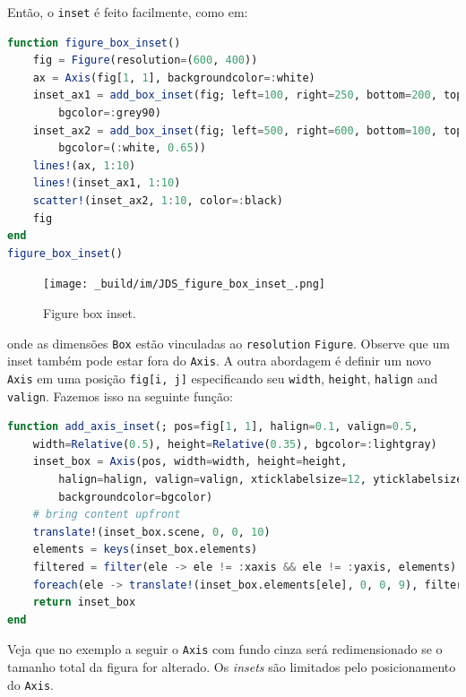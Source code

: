 \documentclass[
  notoc %
]{tufte-book}
\newcommand{\passthrough}[1]{#1}
\begin{document}
Então, o \passthrough{\lstinline!inset!} é feito facilmente, como em:

\begin{lstlisting}[language=Julia]
function figure_box_inset()
    fig = Figure(resolution=(600, 400))
    ax = Axis(fig[1, 1], backgroundcolor=:white)
    inset_ax1 = add_box_inset(fig; left=100, right=250, bottom=200, top=300,
        bgcolor=:grey90)
    inset_ax2 = add_box_inset(fig; left=500, right=600, bottom=100, top=200,
        bgcolor=(:white, 0.65))
    lines!(ax, 1:10)
    lines!(inset_ax1, 1:10)
    scatter!(inset_ax2, 1:10, color=:black)
    fig
end
figure_box_inset()
\end{lstlisting}

\begin{figure}
\hypertarget{fig:figure_box_inset}{%
\centering
\texttt{[image: \_build/im/JDS\_figure\_box\_inset\_.png]}
\caption{Figure box inset.}\label{fig:figure_box_inset}
}
\end{figure}

onde as dimensões \passthrough{\lstinline!Box!} estão vinculadas ao
\passthrough{\lstinline!resolution!} \passthrough{\lstinline!Figure!}.
Observe que um inset também pode estar fora do
\passthrough{\lstinline!Axis!}. A outra abordagem é definir um novo
\passthrough{\lstinline!Axis!} em uma posição
\passthrough{\lstinline!fig[i, j]!} especificando seu
\passthrough{\lstinline!width!}, \passthrough{\lstinline!height!},
\passthrough{\lstinline!halign!} and \passthrough{\lstinline!valign!}.
Fazemos isso na seguinte função:

\begin{lstlisting}[language=Julia]
function add_axis_inset(; pos=fig[1, 1], halign=0.1, valign=0.5,
    width=Relative(0.5), height=Relative(0.35), bgcolor=:lightgray)
    inset_box = Axis(pos, width=width, height=height,
        halign=halign, valign=valign, xticklabelsize=12, yticklabelsize=12,
        backgroundcolor=bgcolor)
    # bring content upfront
    translate!(inset_box.scene, 0, 0, 10)
    elements = keys(inset_box.elements)
    filtered = filter(ele -> ele != :xaxis && ele != :yaxis, elements)
    foreach(ele -> translate!(inset_box.elements[ele], 0, 0, 9), filtered)
    return inset_box
end
\end{lstlisting}

Veja que no exemplo a seguir o \passthrough{\lstinline!Axis!} com fundo
cinza será redimensionado se o tamanho total da figura for alterado. Os
\emph{insets} são limitados pelo posicionamento do
\passthrough{\lstinline!Axis!}.
\end{document}
